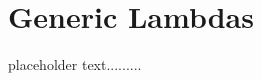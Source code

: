\newpage
\section[Generic Lambdas]{Generic Lambdas}\label{genericlambda}


placeholder text.........


